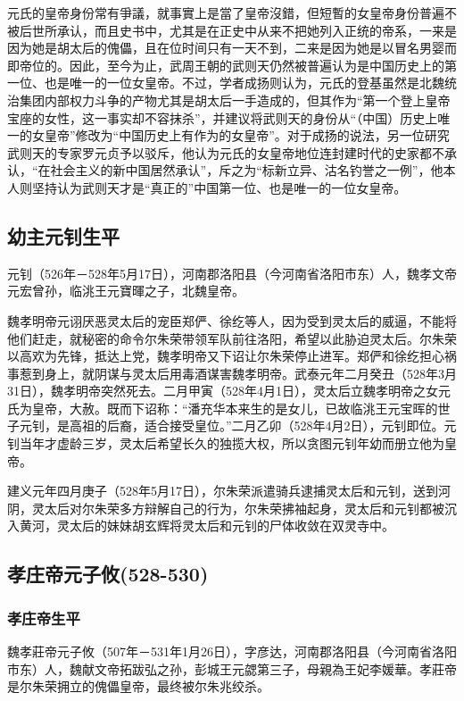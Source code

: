 元氏的皇帝身份常有爭議，就事實上是當了皇帝沒錯，但短暫的女皇帝身份普遍不被后世所承认，而且史书中，尤其是在正史中从来不把她列入正统的帝系，一来是因为她是胡太后的傀儡，且在位时间只有一天不到，二来是因为她是以冒名男婴而即帝位的。因此，至今为止，武周王朝的武则天仍然被普遍认为是中国历史上的第一位、也是唯一的一位女皇帝。不过，学者成扬则认为，元氏的登基虽然是北魏统治集团内部权力斗争的产物尤其是胡太后一手造成的，但其作为“第一个登上皇帝宝座的女性，这一事实却不容抹杀”，并建议将武则天的身份从“（中国）历史上唯一的女皇帝”修改为“中国历史上有作为的女皇帝”。对于成扬的说法，另一位研究武则天的专家罗元贞予以驳斥，他认为元氏的女皇帝地位连封建时代的史家都不承认，“在社会主义的新中国居然承认”，斥之为“标新立异、沽名钓誉之一例”，他本人则坚持认为武则天才是“真正的”中国第一位、也是唯一的一位女皇帝。


\subsection{幼主元钊生平}

元钊（526年－528年5月17日），河南郡洛阳县（今河南省洛阳市东）人，魏孝文帝元宏曾孙，临洮王元寶暉之子，北魏皇帝。

魏孝明帝元诩厌恶灵太后的宠臣郑俨、徐纥等人，因为受到灵太后的威逼，不能将他们赶走，就秘密的命令尔朱荣带领军队前往洛阳，希望以此胁迫灵太后。尔朱荣以高欢为先锋，抵达上党，魏孝明帝又下诏让尔朱荣停止进军。郑俨和徐纥担心祸事惹到身上，就阴谋与灵太后用毒酒谋害魏孝明帝。武泰元年二月癸丑（528年3月31日），魏孝明帝突然死去。二月甲寅（528年4月1日），灵太后立魏孝明帝之女元氏为皇帝，大赦。既而下诏称：“潘充华本来生的是女儿，已故临洮王元宝晖的世子元钊，是高祖的后裔，适合接受皇位。”二月乙卯（528年4月2日），元钊即位。元钊当年才虚龄三岁，灵太后希望长久的独揽大权，所以贪图元钊年幼而册立他为皇帝。

建义元年四月庚子（528年5月17日），尔朱荣派遣骑兵逮捕灵太后和元钊，送到河阴，灵太后对尔朱荣多方辩解自己的行为，尔朱荣拂袖起身，灵太后和元钊都被沉入黄河，灵太后的妹妹胡玄辉将灵太后和元钊的尸体收敛在双灵寺中。

\subsection{孝庄帝元子攸\tiny(528-530)}

\subsubsection{孝庄帝生平}

魏孝莊帝元子攸（507年－531年1月26日），字彦达，河南郡洛阳县（今河南省洛阳市东）人，魏献文帝拓跋弘之孙，彭城王元勰第三子，母親為王妃李媛華。孝莊帝是尔朱荣拥立的傀儡皇帝，最终被尔朱兆绞杀。

